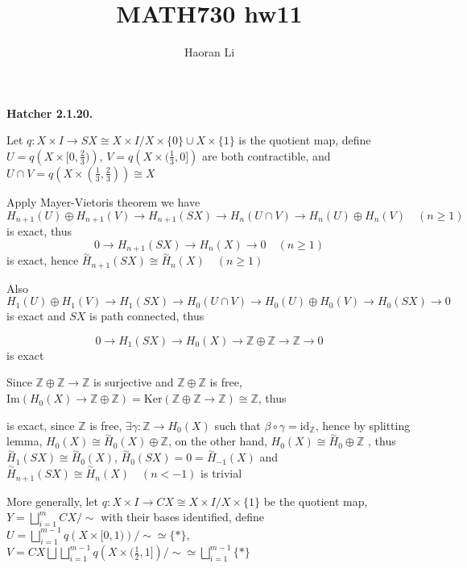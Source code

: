\documentclass[12pt]{article}
\title{MATH730 hw11}
\author{Haoran Li}
\date{}
\begin{document}
\maketitle
\textbf{Hatcher 2.1.20.} \par
Let $q:X\times I\rightarrow SX\cong X\times I/X\times\{0\}\cup X\times\{1\}$ is the quotient map, define $U=q\left(X\times[0,\frac{2}{3})\right)$, $V=q\left(X\times(\frac{1}{3},0]\right)$ are both contractible, and $U\cap V=q\left(X\times(\frac{1}{3},\frac{2}{3})\right)\cong X$ \par
Apply Mayer-Vietoris theorem we have
\[
H_{n+1}(U)\oplus H_{n+1}(V)\rightarrow H_{n+1}(SX)\rightarrow H_n(U\cap V)\rightarrow H_n(U)\oplus H_n(V) \quad (n\geq 1)
\]
is exact, thus
\[
0\rightarrow H_{n+1}(SX)\rightarrow H_n(X)\rightarrow 0 \quad (n\geq 1)
\]
is exact, hence $\overset{\sim}{H}_{n+1}(SX)\cong\overset{\sim}{H}_n(X) \quad (n\geq 1)$ \par
Also
\[
H_1(U)\oplus H_1(V)\rightarrow H_1(SX)\rightarrow H_0(U\cap V)\rightarrow H_0(U)\oplus H_0(V)\rightarrow H_0(SX)\rightarrow 0
\]
is exact and $SX$ is path connected, thus \par
\[
0\rightarrow H_1(SX)\rightarrow H_0(X)\rightarrow \mathbb{Z}\oplus \mathbb{Z}\rightarrow \mathbb{Z}\rightarrow 0
\]
is exact \par
Since $\mathbb{Z}\oplus \mathbb{Z}\rightarrow \mathbb{Z}$ is surjective and $\mathbb{Z}\oplus \mathbb{Z}$ is free, $\mathrm{Im}\left(H_0(X)\rightarrow \mathbb{Z}\oplus \mathbb{Z}\right)=\mathrm{Ker}\left(\mathbb{Z}\oplus \mathbb{Z}\rightarrow \mathbb{Z}\right)\cong\mathbb{Z}$, thus
\begin{center}
\end{center}
is exact, since $\mathbb{Z}$ is free, $\exists\gamma:\mathbb{Z}\rightarrow H_0(X)$ such that $\beta\circ\gamma=\mathrm{id}_\mathbb{Z}$, hence by splitting lemma, $H_0(X)\cong\overset{\sim}{H}_0(X)\oplus\mathbb{Z}$, on the other hand, $H_0(X)\cong\overset{\sim}{H}_0\oplus\mathbb{Z}$ , thus $\overset{\sim}{H}_1(SX)\cong\overset{\sim}{H}_0(X)$, $\overset{\sim}{H}_0(SX)=0=\overset{\sim}{H}_{-1}(X)$ and $\overset{\sim}{H}_{n+1}(SX)\cong\overset{\sim}{H}_n(X) \quad (n<-1)$ is trivial \par
More generally, let $q:X\times I\rightarrow CX\cong X\times I/X\times\{1\}$ be the quotient map, $\displaystyle Y=\bigsqcup_{i=1}^mCX \Big/\sim$ with their bases identified, define $\displaystyle U=\bigsqcup_{i=1}^{m-1}q\left(X\times[0,1)\right) \Big/\sim\simeq\{*\}$, $\displaystyle V=CX\bigsqcup\bigsqcup_{i=1}^{m-1}q\left(X\times(\frac{1}{2},1]\right) \Big/\sim\simeq\bigsqcup_{i=1}^{m-1}\{*\}$ \par
\end{document}
